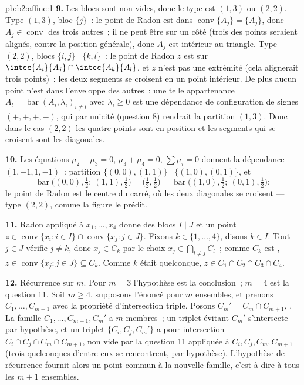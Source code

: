 \begin{solution}{pb:b2:affine:1}
\textbf{9.} Les blocs sont non vides, donc le type est $(1,3)$ ou
$(2,2)$. Type $(1,3)$, bloc $\{j\}$~: le point de Radon est dans
$\operatorname{conv}\{A_j\} = \{A_j\}$, donc $A_j \in
\operatorname{conv}$ des trois autres~; il ne peut être sur un
côté (trois des points seraient alignés, contre la position
générale), donc $A_j$ est intérieur au triangle. Type
$(2,2)$, blocs $\{i,j\} \mid \{k,l\}$~: le point de Radon $z$
est sur $\intcc{A_i}{A_j} \cap \intcc{A_k}{A_l}$, et $z$ n'est
pas une extrémité (cela alignerait trois points)~: les deux
segments se croisent en un point intérieur. De plus aucun point n'est
dans l'enveloppe des autres~: une telle appartenance $A_l =
\operatorname{bar}(A_i, \lambda_i)_{i \neq l}$ avec
$\lambda_i \geq 0$ est une dépendance  de configuration de signes
$(+,+,+,-)$, qui par unicité (question 8) rendrait la
partition $(1,3)$. Donc dans le cas $(2,2)$ les quatre points sont
en position  et les segments qui se croisent sont les
diagonales.

\textbf{10.} Les équations $\mu_2 + \mu_3 = 0$, $\mu_3 +
\mu_4 = 0$, $\sum\mu_i = 0$ donnent la dépendance $(1, -1, 1,
-1)$~: partition $\{(0,0), (1,1)\} \mid \{(1,0), (0,1)\}$, et
\[
\operatorname{bar}\bigl((0,0), \tfrac12;\ (1,1),
\tfrac12\bigr) = \bigl(\tfrac12, \tfrac12\bigr) =
\operatorname{bar}\bigl((1,0), \tfrac12;\ (0,1),
\tfrac12\bigr) :
\]
le point de Radon est le centre du carré, où les deux
diagonales se croisent --- type $(2,2)$, comme la figure le prédit.

\textbf{11.} Radon appliqué à $x_1, \dots, x_4$ donne des blocs
$I \mid J$ et un point $z \in \operatorname{conv}\{x_i : i
\in I\} \cap \operatorname{conv}\{x_j : j \in J\}$. Fixons $k
\in \{1, \dots, 4\}$, disons $k \in I$. Tout $j \in J$
vérifie $j \neq k$, donc $x_j \in C_k$ par le choix $x_j \in
\bigcap_{l \neq j}C_l$~; comme $C_k$ est , $z \in
\operatorname{conv}\{x_j : j \in J\} \subseteq C_k$. Comme $k$
était quelconque, $z \in C_1 \cap C_2 \cap C_3 \cap C_4$.

\textbf{12.} Récurrence sur $m$. Pour $m = 3$ l'hypothèse est
la conclusion~; $m = 4$ est la question 11. Soit $m \geq 4$,
supposons l'énoncé pour $m$ ensembles, et prenons $C_1, \dots,
C_{m+1}$ avec la propriété d'intersection triple. Posons $C_m' =
C_m \cap C_{m+1}$, . La famille $C_1, \dots, C_{m-1},
C_m'$ a $m$ membres~; un triplet évitant $C_m'$ s'intersecte par
hypothèse, et un triplet $\{C_i, C_j, C_m'\}$ a
pour intersection $C_i \cap C_j \cap C_m \cap C_{m+1}$, non vide
par la question 11 appliquée à $C_i, C_j, C_m, C_{m+1}$ (trois
quelconques d'entre eux se rencontrent, par hypothèse). L'hypothèse
de récurrence fournit alors un point commun à la nouvelle famille,
c'est-à-dire à tous les $m+1$ ensembles.


\end{solution}
